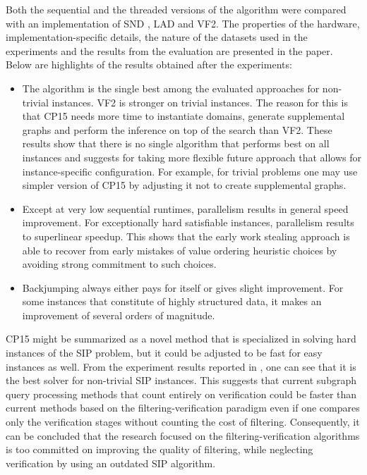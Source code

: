 \documentclass{l4proj}
\newcounter{example}[section]
\begin{document}
Both the sequential and the threaded versions of the algorithm were compared with an implementation of SND \cite{SND}, LAD\cite{Solnon:2010a} and VF2\cite{vf2}. The properties of the hardware, implementation-specific details, the nature of the datasets used in the experiments and the results from the evaluation are presented in the paper\cite{CP2015}. Below are highlights of the results obtained after the experiments:
\begin{itemize}
\item The algorithm is the single best among the evaluated approaches for non-trivial instances. VF2 \cite{vf2} is stronger on trivial instances. The reason for this is that CP15 needs more time to instantiate domains, generate supplemental graphs and perform the inference on top of the search than VF2. These results show that there is no single algorithm that performs best on all instances and suggests for taking more flexible future approach that allows for instance-specific configuration. For example, for trivial problems one may use simpler version of CP15 by adjusting it not to create supplemental graphs.
\item Except at very low sequential runtimes, parallelism results in general speed improvement. For exceptionally hard satisfiable instances, parallelism results to superlinear speedup. This shows that the early work stealing approach is able to recover from early mistakes of value ordering heuristic choices by avoiding strong commitment to such choices.
\item Backjumping always either pays for itself or gives slight improvement. For some instances that constitute of highly structured data, it makes an improvement of several orders of magnitude.
\end{itemize}

CP15 might be summarized as a novel method that is specialized in solving hard instances of the SIP problem, but it could be adjusted to be fast for easy instances as well. From the experiment results reported in \cite{CP2015}, one can see that it is the best solver for non-trivial SIP instances. This suggests that current subgraph query processing methods that count entirely on verification could be faster than current methods based on the filtering-verification paradigm even if one compares only the verification stages without counting the cost of filtering. Consequently, it can be concluded that the research focused on the filtering-verification algorithms is too committed on improving the quality of filtering, while neglecting verification by using an outdated SIP algorithm.
\end{document}
